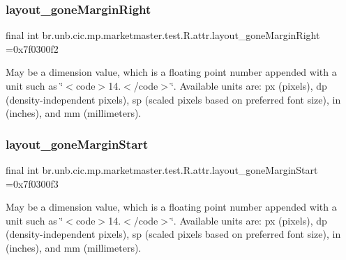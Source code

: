 \subsubsection{\texorpdfstring{layout\+\_\+gone\+Margin\+Right}{layout\_goneMarginRight}}
{\footnotesize\ttfamily final int br.\+unb.\+cic.\+mp.\+marketmaster.\+test.\+R.\+attr.\+layout\+\_\+gone\+Margin\+Right =0x7f0300f2\hspace{0.3cm}{\ttfamily [static]}}

May be a dimension value, which is a floating point number appended with a unit such as \char`\"{}$<$code$>$14.\+5sp$<$/code$>$\char`\"{}. Available units are\+: px (pixels), dp (density-\/independent pixels), sp (scaled pixels based on preferred font size), in (inches), and mm (millimeters). \mbox{\label{classbr_1_1unb_1_1cic_1_1mp_1_1marketmaster_1_1test_1_1R_1_1attr_a91a5e4a66b1e94be47dbba38d627adfd}} 
\subsubsection{\texorpdfstring{layout\+\_\+gone\+Margin\+Start}{layout\_goneMarginStart}}
{\footnotesize\ttfamily final int br.\+unb.\+cic.\+mp.\+marketmaster.\+test.\+R.\+attr.\+layout\+\_\+gone\+Margin\+Start =0x7f0300f3\hspace{0.3cm}{\ttfamily [static]}}

May be a dimension value, which is a floating point number appended with a unit such as \char`\"{}$<$code$>$14.\+5sp$<$/code$>$\char`\"{}. Available units are\+: px (pixels), dp (density-\/independent pixels), sp (scaled pixels based on preferred font size), in (inches), and mm (millimeters). \mbox{\label{classbr_1_1unb_1_1cic_1_1mp_1_1marketmaster_1_1test_1_1R_1_1attr_ae8bcc46cc0922e714c02f419dbf5366b}} 
